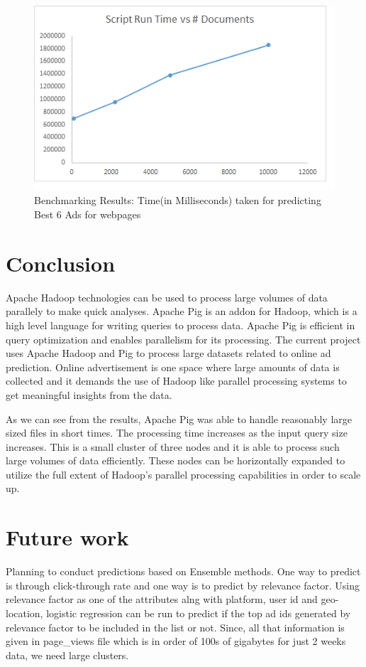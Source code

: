 \documentclass[9pt,twocolumn,twoside]{../../styles/osajnl}
\begin{document}
\begin{figure}[hptb]
\centering
\includegraphics[width=\linewidth]{images/regular.png}
\caption{ Benchmarking Results: Time(in Milliseconds) taken for predicting Best 6 Ads for webpages}
\label{fig:regular}
\end{figure}

\section{Conclusion}
Apache Hadoop technologies can be used to process large volumes of data parallely to make quick analyses. Apache Pig is an addon for Hadoop, which is a high level language for writing queries to process data. Apache Pig is efficient in query optimization and enables parallelism for its processing. The current project uses Apache Hadoop and Pig to process large datasets related to online ad prediction. Online advertisement is one space where large amounts of data is collected and it demands the use of Hadoop like parallel processing systems to get meaningful insights from the data. 

As we can see from the results, Apache Pig was able to handle reasonably large sized files in short times. The processing time increases as the input query size increases. This is a small cluster of three nodes and it is able to process such large volumes of data efficiently. These nodes can be horizontally expanded to utilize the full extent of Hadoop's parallel processing capabilities in order to scale up. 

\section{Future work}
Planning to conduct predictions based on Ensemble methods. One way to predict is through click-through rate and one way is to predict by relevance factor. Using relevance factor as one of the attributes alng with platform, user id and geo-location, logistic regression can be run to predict if the top ad ids generated by relevance factor to be included in the list or not. Since, all that information is given in page\_views file which is in order of 100s of gigabytes for just 2 weeks data, we need large clusters. 
\end{document}
